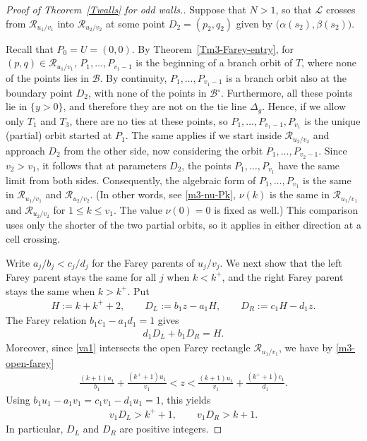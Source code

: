 \documentclass[11pt,reqno,tbtags,a4paper]{amsart}
\numberwithin{equation}{section}
\renewcommand\le{\leq}
\renewcommand\leq{\leqslant}
\theoremstyle{plain}%
\theoremstyle{definition}
\theoremstyle{remark}
\newcommand{\refT}[1]{Theorem~\ref{#1}}
\newcommand\set[1]{\ensuremath{\{#1\}}}
\newcommand\bigpar[1]{\bigl(#1\bigr)}
\newcommand\inter{\ensuremath{^\circ}}
\newcommand\ga{\alpha}
\newcommand\gb{\beta}
\newcommand\gD{\Delta}
\newcommand\cB{\mathcal B}
\newcommand\LL{{\mathcal L}}
\newcommand\cR{{\mathcal R}}
\newcommand\uvx[1]{_{u_{#1}/v_{#1}}}
\newcommand\kx{{k^+}}
\newcommand\0{{\boldsymbol 0}}
\newcommand\1{{\boldsymbol 1}}
\begin{document}
\begin{proof}[Proof of \refT{Twalls} for odd walls.]
Suppose that $N>1$, so that $\LL$ crosses from $\cR\uvx1$ into $\cR\uvx2$ at
some point $D_2=(p_2,q_2)$ given by $\bigpar{\ga(s_2),\gb(s_2)}$.

Recall that $P_0=U=(0,0)$.
By \refT{Tm3-Farey-entry}, for $(p,q)\in\cR\uvx1$, $P_1,\dots,P_{v_1-1}$ 
is the beginning of a branch orbit of $T$, where none of the points lies in
$\cB$. By continuity, $P_1,\dots,P_{v_1-1}$ is a branch orbit also
at the boundary point $D_2$, with none of the points in
$\cB\inter$. 
Furthermore, all these points lie in $\set{y>0}$, and therefore they are not
on the tie line $\gD_g$. Hence, if we allow only $T_1$ and $T_3$, there are
no ties at these points, so $P_1,\dots,P_{v_1-1},P_{v_1}$ is the unique
(partial) orbit started at $P_1$.
The same applies if we start inside $\cR\uvx2$ and approach $D_2$ from the
other side, now considering the orbit $P_1,\dots,P_{v_2-1}$.
Since $v_2>v_1$, it follows that at parameters $D_2$,
the points $P_1,\dots,P_{v_1}$ have the same limit from both sides.
Consequently, the algebraic form of
$P_1,\dots,P_{v_1}$  is the same in $\cR\uvx1$ and $\cR\uvx2$.
(In other words, see \eqref{m3-nu-Pk}, $\nu(k)$ is the same in
$\cR\uvx1$ and $\cR\uvx2$ for $1\le k \le v_1$.
The value $\nu(0)=0$ is fixed as well.)
This comparison uses only the shorter of the two partial orbits,
so it applies in either direction at a cell crossing.

Write $a_j/b_j<c_j/d_j$ for the Farey parents of $u_j/v_j$.
We next show that the left Farey parent stays the same for all $j$ when
$k<\kx$, and the right Farey parent stays the same when $k>\kx$.
Put
\begin{align}\label{va5}
 H:=k+\kx+2,\qquad
 D_L:=b_1z-a_1H,\qquad D_R:=c_1H-d_1z.
\end{align}
The Farey relation $b_1c_1-a_1d_1=1$ gives
\begin{align}\label{va6}
 d_1D_L+b_1D_R=H.
\end{align}
Moreover, since \eqref{va1} intersects the open Farey rectangle
$\cR\uvx1$,
we have by \eqref{m3-open-farey}
\begin{align}\label{va7}
 \frac{(k+1)a_1}{b_1}+\frac{(\kx+1)u_1}{v_1}
 <z<
 \frac{(k+1)u_1}{v_1}+\frac{(\kx+1)c_1}{d_1}.
\end{align}
Using $b_1u_1-a_1v_1=c_1v_1-d_1u_1=1$, this yields
\begin{align}\label{va8}
 v_1D_L>\kx+1,\qquad v_1D_R>k+1.
\end{align}
In particular, $D_L$ and $D_R$ are positive integers.


\end{proof}
\end{document}
